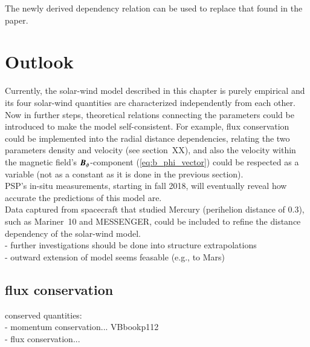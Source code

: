 The newly derived dependency relation can be used to replace that found in the paper.\\


\section{Outlook}
Currently, the solar-wind model described in this chapter is purely empirical and its four solar-wind quantities are characterized independently from each other. Now in further steps, theoretical relations connecting the parameters could be introduced to make the model self-consistent. For example, flux conservation could be implemented into the radial distance dependencies, relating the two parameters density and velocity (see section~XX), and also the velocity within the magnetic field's $\boldsymbol{B}_\phi$-component (\autoref{eq:b_phi_vector}) could be respected as a variable (not as a constant as it is done in the previous section).\\

PSP's in-situ measurements, starting in fall 2018, will eventually reveal how accurate the predictions of this model are.\\

Data captured from spacecraft that studied Mercury (perihelion distance of \SI{0.3}{\au}), such as Mariner~10 and MESSENGER, could be included to refine the distance dependency of the solar-wind model.\\

- further investigations should be done into structure extrapolations\\
- outward extension of model seems feasable (e.g., to Mars)\\


\subsection{flux conservation}
conserved quantities:\\
- momentum conservation... VBbookp112\\
- flux conservation...\\


